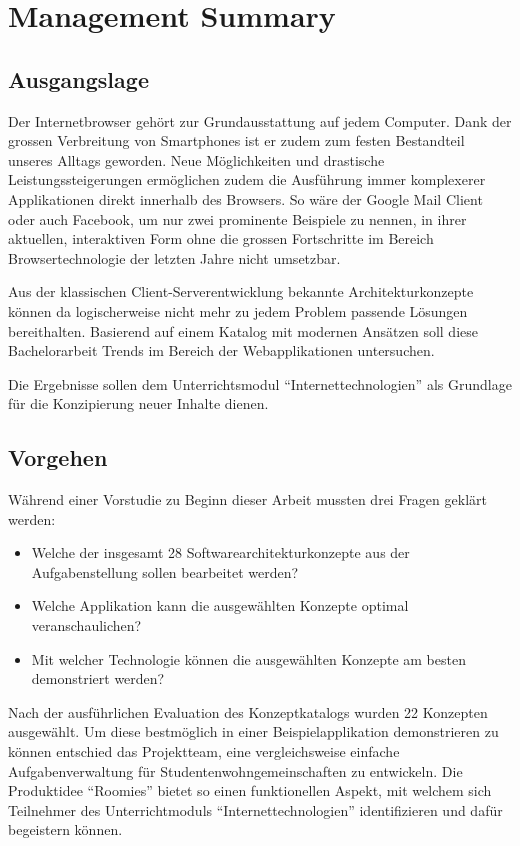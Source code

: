 \chapter{Management Summary}

\section{Ausgangslage}
Der Internetbrowser gehört zur Grundausstattung auf jedem Computer. Dank der grossen Verbreitung von Smartphones ist er zudem zum festen Bestandteil unseres Alltags geworden. Neue Möglichkeiten und drastische Leistungssteigerungen ermöglichen zudem die Ausführung immer komplexerer Applikationen direkt innerhalb des Browsers. So wäre der Google Mail Client oder auch Facebook, um nur zwei prominente Beispiele zu nennen, in ihrer aktuellen, interaktiven Form ohne die grossen Fortschritte im Bereich Browsertechnologie der letzten Jahre nicht umsetzbar.

Aus der klassischen Client-Serverentwicklung bekannte Architekturkonzepte können da logischerweise nicht mehr zu jedem Problem passende Lösungen bereithalten. Basierend auf einem Katalog mit modernen Ansätzen soll diese Bachelorarbeit Trends im Bereich der Webapplikationen untersuchen.

Die Ergebnisse sollen dem Unterrichtsmodul ``Internettechnologien'' als Grundlage für die Konzipierung neuer Inhalte dienen.


\section{Vorgehen}

Während einer Vorstudie zu Beginn dieser Arbeit mussten drei Fragen geklärt werden:

\begin{itemize}
	\item Welche der insgesamt 28 Softwarearchitekturkonzepte aus der Aufgabenstellung sollen bearbeitet werden?
	\item Welche Applikation kann die ausgewählten Konzepte optimal veranschaulichen?
	\item Mit welcher Technologie können die ausgewählten Konzepte am besten demonstriert werden?
\end{itemize}

Nach der ausführlichen Evaluation des Konzeptkatalogs wurden 22 Konzepten ausgewählt. Um diese bestmöglich in einer Beispielapplikation demonstrieren zu können entschied das Projektteam, eine vergleichsweise einfache Aufgabenverwaltung für Studentenwohngemeinschaften zu entwickeln. Die Produktidee ``Roomies'' bietet so einen funktionellen Aspekt, mit welchem sich Teilnehmer des Unterrichtmoduls ``Internettechnologien'' identifizieren und dafür begeistern können.

